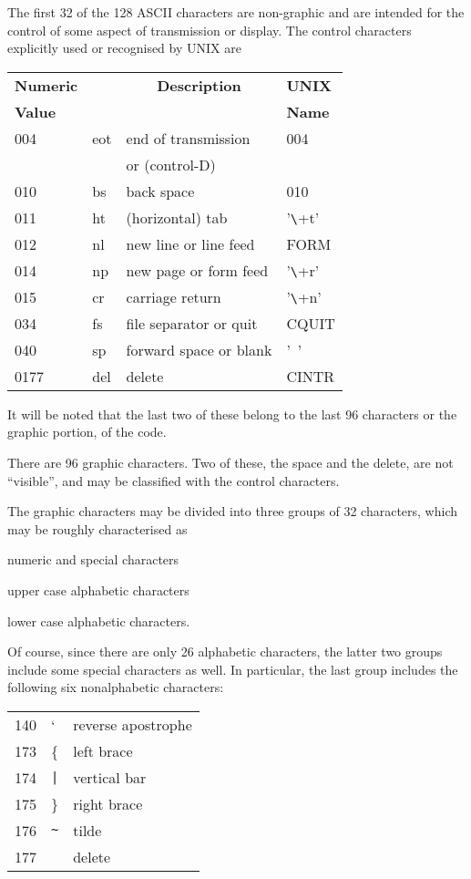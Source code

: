 The first 32 of the 128 ASCII characters are non-graphic and are intended
for the control of some aspect of
transmission or display. The control
characters explicitly used or recognised by UNIX are

\noindent\begin{tabular}{llll}\\
{\bf Numeric} & & \multicolumn{1}{c}{\bf Description} & {\bf UNIX} \\
{\bf Value} &	&	& {\bf Name} \\ \hline
004 & eot & end of transmission		& 004 \\
    &    & or (control-D) & \\
010 & bs & back space			& 010 \\
011 & ht & (horizontal) tab		& '\verb+\+t' \\
012 & nl & new line or line feed	& FORM \\
014 & np & new page or form feed	& '\verb+\+r' \\
015 & cr & carriage return		& '\verb+\+n' \\
034 & fs & file separator or quit	& CQUIT \\
040 & sp & forward space or blank	& '~' \\
0177 & del & delete			& CINTR
\end{tabular}


It will be noted that the last two of
these belong to the last 96 characters
or the graphic portion, of the code.


There are 96 graphic characters. Two of
these, the space and the delete, are
not ``visible'', and may be classified
with the control characters.

The graphic characters may be divided
into three groups of 32 characters,
which may be roughly characterised as

\bi
\item numeric and special characters
\item upper case alphabetic characters
\item lower case alphabetic characters.
\ei

Of course, since there are only 26
alphabetic characters, the latter two
groups include some special characters
as well. In particular, the last group
includes the following six nonalphabetic characters:

\begin{tabular}{lll}\\
140 & `			& reverse apostrophe \\
173 & \{		& left brace \\
174 & \verb+|+		& vertical bar \\
175 & \}		& right brace \\
176 & \verb+~+		& tilde \\
177 &			& delete \\
\end{tabular}

